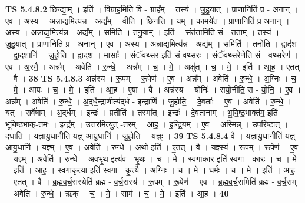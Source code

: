 \documentclass[17pt]{extarticle}
\begin{document}
                  \newline
                                \textbf{ TS 5.4.8.2} \newline
                  छि॒न्द्या॒म् । इति॑ । वि॒ग्राह॒मिति॑ वि - ग्राह᳚म् । तस्य॑ । जु॒हु॒या॒त् । प्रा॒णानिति॑ प्र - अ॒नान् । ए॒व । अ॒स्य॒ । अ॒न्नाद्य॒मित्य॑न्न - अद्य᳚म् । वीति॑ । छि॒न॒त्ति॒ । यम् । का॒मये॑त । प्रा॒णानिति॑ प्र-अ॒नान् । अ॒स्य॒ । अ॒न्नाद्य॒मित्य॑न्न - अद्य᳚म् । समिति॑ । त॒नु॒या॒म् । इति॑ । संत॑ता॒मिति॒ सं - त॒ता॒म् । तस्य॑ । जु॒हु॒या॒त् । प्रा॒णानिति॑ प्र - अ॒नान् । ए॒व । अ॒स्य॒ । अ॒न्नाद्य॒मित्य॑न्न - अद्य᳚म् । समिति॑ । त॒नो॒ति॒ । द्वाद॑श । द्वा॒द॒शानि॑ । जु॒हो॒ति॒ । द्वाद॑श । मासाः᳚ । सं॒ॅव॒थ्स॒र इति॑ सं-व॒थ्स॒रः । सं॒ॅव॒थ्स॒रेणेति॑ सं - व॒थ्स॒रेण॑ । ए॒व । अ॒स्मै॒ । अन्न᳚म् । अवेति॑ । रु॒न्धे॒ । अन्न᳚म् । च॒ । मे॒ । अक्षु॑त् । च॒ । मे॒ । इति॑ । आ॒ह॒ । ए॒तत् । वै । \textbf{  38} \newline
                  \newline
                                \textbf{ TS 5.4.8.3} \newline
                  अन्न॑स्य । रू॒पम् । रू॒पेण॑ । ए॒व । अन्न᳚म् । अवेति॑ । रु॒न्धे॒ । अ॒ग्निः । च॒ । मे॒ । आपः॑ । च॒ । मे॒ । इति॑ । आ॒ह॒ । ए॒षा । वै । अन्न॑स्य । योनिः॑ । सयो॒नीति॒ स - यो॒नि॒ । ए॒व । अन्न᳚म् । अवेति॑ । रु॒न्धे॒ । अ॒द्‌र्धे॒न्द्राणीत्य॑द्‌र्ध - इ॒न्द्राणि॑ । जु॒हो॒ति॒ । दे॒वताः᳚ । ए॒व । अवेति॑ । रु॒न्धे॒ । यत् । सर्वे॑षाम् । अ॒द्‌र्धम् । इन्द्रः॑ । प्रतीति॑ । तस्मा᳚त् । इन्द्रः॑ । दे॒वता॑नाम् । भू॒यि॒ष्ठ॒भाक्त॑म॒ इति॑ भूयिष्ठ॒भाक्-त॒मः॒ । इन्द्र᳚म् । उत्त॑र॒मित्युत् -त॒र॒म् । आ॒ह॒ । इ॒न्द्रि॒यम् । ए॒व । अ॒स्मि॒न्न् । उ॒परि॑ष्टात् । द॒धा॒ति॒ । य॒ज्ञा॒यु॒धानीति॑ यज्ञ्-आ॒यु॒धानि॑ । जु॒हो॒ति॒ । य॒ज्ञ्ः । \textbf{  39} \newline
                  \newline
                                \textbf{ TS 5.4.8.4} \newline
                  वै । य॒ज्ञा॒यु॒धानीति॑ यज्ञ्-आ॒यु॒धानि॑ । य॒ज्ञ्म् । ए॒व । अवेति॑ । रु॒न्धे॒ । अथो॒ इति॑ । ए॒तत् । वै । य॒ज्ञ्स्य॑ । रू॒पम् । रू॒पेण॑ । ए॒व । य॒ज्ञ्म् । अवेति॑ । रु॒न्धे॒ । अ॒व॒भृ॒थ इत्य॑व - भृ॒थः । च॒ । मे॒ । स्व॒गा॒का॒र इति॑ स्वगा - का॒रः । च॒ । मे॒ । इति॑ । आ॒ह॒ । स्व॒गाकृ॑त्या॒ इति॑ स्व॒गा - कृ॒त्यै॒ । अ॒ग्निः । च॒ । मे॒ । घ॒र्मः । च॒ । मे॒ । इति॑ । आ॒ह॒ । ए॒तत् । वै । ब्र॒ह्म॒व॒र्च॒सस्येति॑ ब्रह्म - व॒र्च॒सस्य॑ । रू॒पम् । रू॒पेण॑ । ए॒व । ब्र॒ह्म॒व॒र्च॒समिति॑ ब्रह्म - व॒र्च॒सम् । अवेति॑ । रु॒न्धे॒ । ऋक् । च॒ । मे॒ । साम॑ । च॒ । मे॒ । इति॑ । आ॒ह॒ । \textbf{  40} \newline
                  \newline
\end{document}

